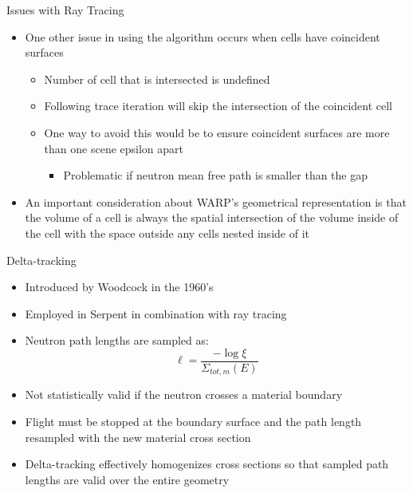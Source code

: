 \documentclass[xcolor=x11names,compress, handout]{beamer}
\renewcommand{\(}{\begin{columns}}
\renewcommand{\)}{\end{columns}}
\newcommand{\<}[1]{\begin{column}{#1}}
\renewcommand{\>}{\end{column}}
\begin{document}
\begin{frame}{Issues with Ray Tracing \cite{warp}}
	\begin{itemize}
	\pause
	\item{One other issue in using the algorithm occurs when cells have coincident surfaces}
		\begin{itemize}
		\pause
		\item{Number of cell that is intersected is undefined}
		\pause
		\item{Following trace iteration will skip the intersection of the coincident cell}
		\pause
		\item{One way to avoid this would be to ensure coincident surfaces are more than one scene
		epsilon apart}
			\begin{itemize}
			\pause
			\item{Problematic if neutron mean free path is smaller than the gap}
			\end{itemize}
		\end{itemize}
	\pause
	\item{An important consideration about WARP's geometrical representation is that the volume of a
	cell is always the spatial intersection of the volume inside of the cell with the space outside
	any cells nested inside of it}
	\end{itemize}
\end{frame}


\begin{frame}{Delta-tracking}
	\begin{itemize}
	\pause
	\item{Introduced by Woodcock in the 1960's}
	\pause
	\item{Employed in Serpent in combination with ray tracing \cite{serpent}}
	\pause
	\item{Neutron path lengths are sampled as:}
		\begin{equation*}
		\ell = \frac{-\log\xi}{\Sigma_{tot,m}(E)}
		\end{equation*}
	\pause
	\item{Not statistically valid if the neutron crosses a material boundary}
	\pause
	\item{Flight must be stopped at the boundary surface and the path length resampled with the new 
	material cross section}
	\pause
	\item{Delta-tracking effectively homogenizes cross sections so that sampled path lengths are valid
	over the entire geometry}
	\end{itemize}
\end{frame}
\end{document}
